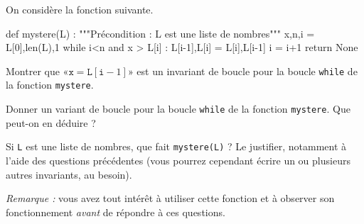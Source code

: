 On considère la fonction suivante.
\begin{pyverbatim}
def mystere(L) :
    """Précondition : L est une liste de nombres"""
    x,n,i = L[0],len(L),1
    while i<n and x > L[i] :
        L[i-1],L[i] = L[i],L[i-1]
        i = i+1
    return None
\end{pyverbatim}

\question{}Montrer que «$\texttt x = \texttt L[\texttt i-1]$» est un invariant de boucle pour la boucle \texttt{while} de la fonction \texttt{mystere}.

\question{}Donner un variant de boucle pour la boucle \texttt{while} de la fonction \texttt{mystere}. Que peut-on en déduire ? 

\question{}Si \texttt{L} est une liste de nombres, que fait \texttt{mystere(L)} ? Le justifier, notamment à l'aide des questions précédentes (vous pourrez cependant écrire un ou plusieurs autres invariants, au besoin).

\bigskip{}

\emph{Remarque :} vous avez tout intérêt à utiliser cette fonction et à observer son fonctionnement \emph{avant} de répondre à ces questions. 


